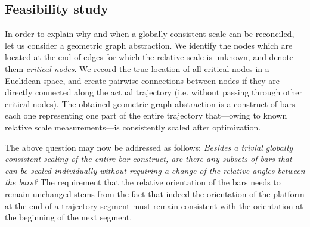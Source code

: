 \documentclass[letterpaper, 10 pt, conference]{ieeeconf}  %
\begin{document}
\subsection{Feasibility study}

In order to explain why and when a globally consistent scale can be reconciled, let us consider a geometric graph abstraction. We identify the nodes which are located at the end of edges for which the relative scale is unknown, and denote them \textit{critical nodes}. We record the true location of all critical nodes in a Euclidean space, and create pairwise connections between nodes if they are directly connected along the actual trajectory (i.e. without passing through other critical nodes). The obtained geometric graph abstraction is a construct of bars each one representing one part of the entire trajectory that---owing to known relative scale measurements---is consistently scaled after optimization.

The above question may now be addressed as follows: \textit{Besides a trivial globally consistent scaling of the entire bar construct, are there any subsets of bars that can be scaled individually without requiring a change of the relative angles between the bars?} The requirement that the relative orientation of the bars needs to remain unchanged stems from the fact that indeed the orientation of the platform at the end of a trajectory segment must remain consistent with the orientation at the beginning of the next segment.
\end{document}
